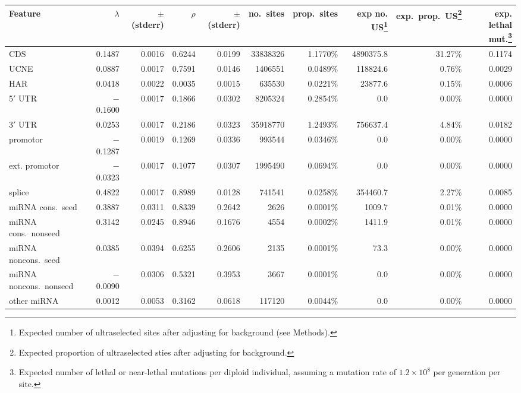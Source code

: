 \documentclass[11pt]{article}
\begin{document}
\begin{table}
    \centering
  \begin{footnotesize}
  \begin{tabular}{lrrrrrrrrr}
  \hline
  Feature	& $\lambda$ & $\pm$ (stderr) & $\rho$ & $\pm$ (stderr) &no.\ sites & prop.\ sites&	exp no. US\footnote{Expected number of ultraselected sites after adjusting for background (see Methods).} & exp.\ prop.\ US\footnote{Expected proportion of ultraselected sties after adjusting for background.}&exp. lethal mut.\footnote{Expected number of lethal or near-lethal mutations per diploid individual, assuming a mutation rate of $1.2\times 10^8$ per generation per site.}\\
  \hline
CDS & 0.1487 & 0.0016 & 0.6244 & 0.0199 & 33838326 & 1.1770\% & 4890375.8 & 31.27\% & 0.1174\\
UCNE & 0.0887 & 0.0017 & 0.7591 & 0.0146 & 1406551 & 0.0489\% & 118824.6 & 0.76\% & 0.0029\\
HAR & 0.0418 & 0.0022 & 0.0035 & 0.0015 & 635530 & 0.0221\% & 23877.6 & 0.15\% & 0.0006\\
5$'$ UTR & $-$0.1600 & 0.0017 & 0.1866 & 0.0302 & 8205324 & 0.2854\% & 0.0 & 0.00\% & 0.0000\\
3$'$ UTR & 0.0253 & 0.0017 & 0.2186 & 0.0323 & 35918770 & 1.2493\% & 756637.4 & 4.84\% & 0.0182\\
promotor & $-$0.1287 & 0.0019 & 0.1269 & 0.0336 & 993544 & 0.0346\% & 0.0 & 0.00\% & 0.0000\\
ext. promotor  & $-$0.0323 & 0.0017 & 0.1077 & 0.0307 & 1995490 & 0.0694\% & 0.0 & 0.00\% & 0.0000\\
splice & 0.4822 & 0.0017 & 0.8989 & 0.0128 & 741541 & 0.0258\% & 354460.7 & 2.27\% & 0.0085\\
miRNA cons.\ seed & 0.3887 & 0.0311 & 0.8339 & 0.2642 & 2626 & 0.0001\% & 1009.7 & 0.01\% & 0.0000\\
miRNA cons.\ nonseed & 0.3142 & 0.0245 & 0.8946 & 0.1676 & 4554 & 0.0002\% & 1411.9 & 0.01\% & 0.0000\\
miRNA noncons.\ seed & 0.0385 & 0.0394 & 0.6255 & 0.2606 & 2135 & 0.0001\% & 73.3 & 0.00\% & 0.0000\\
miRNA noncons.\ nonseed & $-$0.0090 & 0.0306 & 0.5321 & 0.3953 & 3667 & 0.0001\% & 0.0 & 0.00\% & 0.0000\\
other miRNA & 0.0012 & 0.0053 & 0.3162 & 0.0618 & 117120 & 0.0044\% & 0.0 & 0.00\% & 0.0000\\

\end{tabular}
\end{footnotesize}
\end{table}
\end{document}
